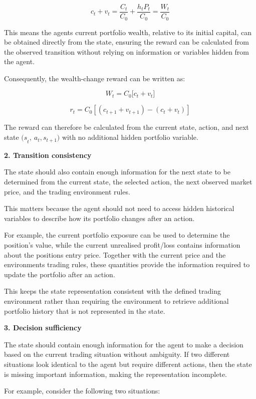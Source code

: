 \[c_{t} + v_{t} = \frac{C_{t}}{C_{0}} + \frac{h_{t}P_{t}}{C_{0}} = \frac{W_{t}}{C_{0}}\]

This means the agent\textquotesingle s current portfolio wealth,
relative to its initial capital, can be obtained directly from the
state, ensuring the reward can be calculated from the observed
transition without relying on information or variables hidden from the
agent.

Consequently, the wealth-change reward can be written as:

\[W_{t} = C_{0}\lbrack c_{t} + v_{t}\rbrack\]

\[r_{t} = C_{0}\left\lbrack \left( c_{t + 1} + v_{t + 1} \right) - \left( c_{t} + v_{t} \right) \right\rbrack\]

The reward can therefore be calculated from the current state, action,
and next state \({(s}_{t},\ a_{t},s_{t + 1})\) with no additional hidden
portfolio variable.

\textbf{2. Transition consistency}

The state should also contain enough information for the next state to
be determined from the current state, the selected action, the next
observed market price, and the trading environment rules.

This matters because the agent should not need to access hidden
historical variables to describe how its portfolio changes after an
action.

For example, the current portfolio exposure can be used to determine the
position's value, while the current unrealised profit/loss contains
information about the position\textquotesingle s entry price. Together
with the current price and the environment\textquotesingle s trading
rules, these quantities provide the information required to update the
portfolio after an action.

This keeps the state representation consistent with the defined trading
environment rather than requiring the environment to retrieve additional
portfolio history that is not represented in the state.

\textbf{3. Decision sufficiency}

The state should contain enough information for the agent to make a
decision based on the current trading situation without ambiguity. If
two different situations look identical to the agent but require
different actions, then the state is missing important information,
making the representation incomplete.

For example, consider the following two situations:

